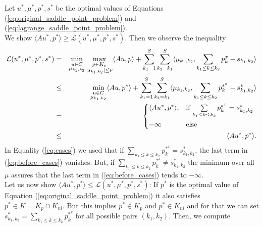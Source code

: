 \documentclass[abstracton]{scrreprt}
\newenvironment{proof}[1][Proof]{\begin{trivlist}
\item[\hskip \labelsep {\bfseries #1}]}{\end{trivlist}}
\begin{document}
            \begin{proof}
                Let $u^{\ast}, \mu^{\ast}, p^{\ast}, s^{\ast}$ be the optimal values of Equations (\ref{eq:original_saddle_point_problem}) and (\ref{eq:lagrange_saddle_point_problem}).\\
                We show $\langle Au^{\ast}, p^{\ast} \rangle \ge \mathcal{L}(u^{\ast}, \mu^{\ast}, p^{\ast}, s^{\ast})$. Then we observe the inequality
                    \begin{eqnarray}
                        \mathcal{L}(u^{\ast}, \mu^{\ast}, p^{\ast}, s^{\ast}) &=& \min_{\substack{u \in C \\ \mu_{k_{1}, k_{2}}}} \max_{\substack{p \in K_{p} \\ |s_{k_{1}, k_{2}}| \le \nu}} \langle Au, p \rangle + \sum_{k_{1} = 1}^{S} \sum_{k_{2} = k_{1}}^{S} \langle \mu_{k_{1}, k_{2}}, \sum_{k_{1} \le k \le k_{2}} p^{x}_{k} - s_{k_{1}, k_{2}} \rangle \notag \\
                        &\le& \min_{\substack{u \in C \\ \mu_{k_{1}, k_{2}}}} \langle Au, p^{\ast} \rangle + \sum_{k_{1} = 1}^{S} \sum_{k_{2} = k_{1}}^{S} \langle \mu_{k_{1}, k_{2}}, \sum_{k_{1} \le k \le k_{2}} p^{\ast^{x}}_{k} - s^{\ast}_{k_{1}, k_{2}} \rangle \label{eq:before_cases} \\
                        &=& \begin{dcases*}
                            \langle Au^{\ast}, p^{\ast} \rangle, & \textnormal{if $\sum\limits_{k_{1} \le k \le k_{2}} p^{\ast^{x}}_{k} = s^{\ast}_{k_{1}, k_{2}}$} \\
                            -\infty & \textnormal{else}
                        \end{dcases*} \label{eq:cases} \\
                        &\le& \langle Au^{\ast}, p^{\ast} \rangle. \notag
                    \end{eqnarray}
                In Equality (\ref{eq:cases}) we used that if $\sum_{k_{1} \le k \le k_{2}} p^{\ast^{x}}_{k} = s^{\ast}_{k_{1}, k_{2}}$, the last term in (\ref{eq:before_cases}) vanishes. But, if $\sum_{k_{1} \le k \le k_{2}} p^{\ast^{x}}_{k} \neq s^{\ast}_{k_{1}, k_{2}}$ the minimum over all $\mu$ assures that the last term in (\ref{eq:before_cases}) tends to $-\infty$.\\
                Let us now show $\langle Au^{\ast}, p^{\ast} \rangle \le \mathcal{L}(u^{\ast}, \mu^{\ast}, p^{\ast}, s^{\ast})$: If $p^{\ast}$ is the optimal value of Equation (\ref{eq:original_saddle_point_problem}) it also satisfies $p^{\ast} \in K = K_{p} \cap K_{nl}$. But this implies $p^{\ast} \in K_{p}$ and $p^{\ast} \in K_{nl}$ and for that we can set $s^{\ast}_{k_{1}, k_{2}} = \sum_{k_{1} \le k \le k_{2}} p^{\ast^{x}}_{k}$ for all possible pairs $(k_{1}, k_{2})$. Then, we compute

\end{proof}
\end{document}
